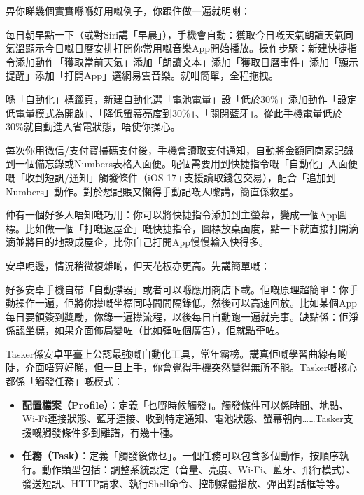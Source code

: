 畀你睇幾個實實喺喺好用嘅例子，你跟住做一遍就明喇：


每日朝早點一下（或對Siri講「早晨」），手機會自動：獲取今日嘅天氣朗讀天氣同氣溫顯示今日嘅日曆安排打開你常用嘅音樂App開始播放。操作步驟：新建快捷指令添加動作「獲取當前天氣」添加「朗讀文本」添加「獲取日曆事件」添加「顯示提醒」添加「打開App」選網易雲音樂。就咁簡單，全程拖拽。


喺「自動化」標籤頁，新建自動化選「電池電量」設「低於30\%」添加動作「設定低電量模式為開啟」、「降低螢幕亮度到30\%」、「關閉藍牙」。從此手機電量低於30\%就自動進入省電狀態，唔使你操心。


每次你用微信/支付寶掃碼支付後，手機會讀取支付通知，自動將金額同商家記錄到一個備忘錄或Numbers表格入面便。呢個需要用到快捷指令嘅「自動化」入面便嘅「收到短訊/通知」觸發條件（iOS 17+支援讀取錢包交易），配合「追加到Numbers」動作。對於想記賬又懶得手動記嘅人嚟講，簡直係救星。

仲有一個好多人唔知嘅巧用：你可以將快捷指令添加到主螢幕，變成一個App圖標。比如做一個「打嘅返屋企」嘅快捷指令，圖標放桌面度，點一下就直接打開滴滴並將目的地設成屋企，比你自己打開App慢慢輸入快得多。


安卓呢邊，情況稍微複雜啲，但天花板亦更高。先講簡單嘅：


好多安卓手機自帶「自動㩒器」或者可以喺應用商店下載。佢嘅原理超簡單：你手動操作一遍，佢將你㩒嘅坐標同時間間隔錄低，然後可以高速回放。比如某個App每日要領簽到獎勵，你錄一遍㩒流程，以後每日自動跑一遍就完事。缺點係：佢淨係認坐標，如果介面佈局變咗（比如彈咗個廣告），佢就點歪咗。


Tasker係安卓平臺上公認最強嘅自動化工具，常年霸榜。講真佢嘅學習曲線有啲陡，介面唔算好睇，但一旦上手，你會覺得手機突然變得無所不能。Tasker嘅核心都係「觸發任務」嘅模式：

\begin{itemize}
  \item \textbf{配置檔案（Profile）}：定義「乜嘢時候觸發」。觸發條件可以係時間、地點、Wi-Fi連接狀態、藍牙連接、收到特定通知、電池狀態、螢幕朝向……Tasker支援嘅觸發條件多到離譜，有幾十種。
  \item \textbf{任務（Task）}：定義「觸發後做乜」。一個任務可以包含多個動作，按順序執行。動作類型包括：調整系統設定（音量、亮度、Wi-Fi、藍牙、飛行模式）、發送短訊、HTTP請求、執行Shell命令、控制媒體播放、彈出對話框等等。
\end{itemize}

